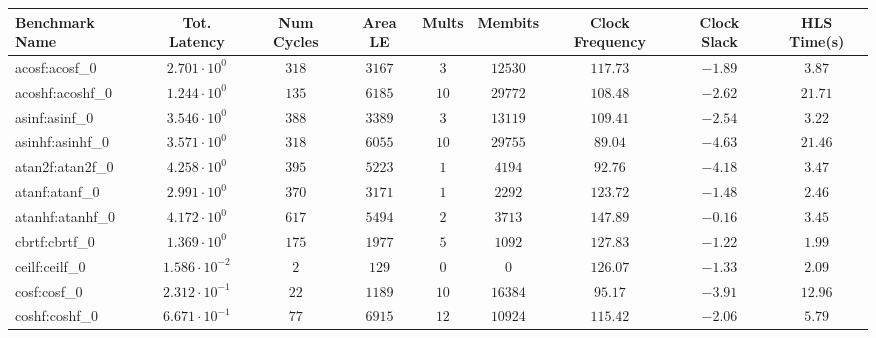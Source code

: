 \begin{tabular}{|l|c|c|c|c|c|c|c|c|}
\hline
Benchmark Name               & Tot. Latency            & Num Cycles & Area LE    & Mults   & Membits    & Clock Frequency & Clock Slack & HLS Time(s) \\
\hline
acosf:acosf\_0               & $ 2.701 \cdot 10^{0}  $ & $ 318    $ & $ 3167   $ & $ 3   $ & $ 12530  $ & $ 117.73      $ & $ -1.89   $ & $ 3.87    $ \\
acoshf:acoshf\_0             & $ 1.244 \cdot 10^{0}  $ & $ 135    $ & $ 6185   $ & $ 10  $ & $ 29772  $ & $ 108.48      $ & $ -2.62   $ & $ 21.71   $ \\
asinf:asinf\_0               & $ 3.546 \cdot 10^{0}  $ & $ 388    $ & $ 3389   $ & $ 3   $ & $ 13119  $ & $ 109.41      $ & $ -2.54   $ & $ 3.22    $ \\
asinhf:asinhf\_0             & $ 3.571 \cdot 10^{0}  $ & $ 318    $ & $ 6055   $ & $ 10  $ & $ 29755  $ & $ 89.04       $ & $ -4.63   $ & $ 21.46   $ \\
atan2f:atan2f\_0             & $ 4.258 \cdot 10^{0}  $ & $ 395    $ & $ 5223   $ & $ 1   $ & $ 4194   $ & $ 92.76       $ & $ -4.18   $ & $ 3.47    $ \\
atanf:atanf\_0               & $ 2.991 \cdot 10^{0}  $ & $ 370    $ & $ 3171   $ & $ 1   $ & $ 2292   $ & $ 123.72      $ & $ -1.48   $ & $ 2.46    $ \\
atanhf:atanhf\_0             & $ 4.172 \cdot 10^{0}  $ & $ 617    $ & $ 5494   $ & $ 2   $ & $ 3713   $ & $ 147.89      $ & $ -0.16   $ & $ 3.45    $ \\
cbrtf:cbrtf\_0               & $ 1.369 \cdot 10^{0}  $ & $ 175    $ & $ 1977   $ & $ 5   $ & $ 1092   $ & $ 127.83      $ & $ -1.22   $ & $ 1.99    $ \\
ceilf:ceilf\_0               & $ 1.586 \cdot 10^{-2} $ & $ 2      $ & $ 129    $ & $ 0   $ & $ 0      $ & $ 126.07      $ & $ -1.33   $ & $ 2.09    $ \\
cosf:cosf\_0                 & $ 2.312 \cdot 10^{-1} $ & $ 22     $ & $ 1189   $ & $ 10  $ & $ 16384  $ & $ 95.17       $ & $ -3.91   $ & $ 12.96   $ \\
coshf:coshf\_0               & $ 6.671 \cdot 10^{-1} $ & $ 77     $ & $ 6915   $ & $ 12  $ & $ 10924  $ & $ 115.42      $ & $ -2.06   $ & $ 5.79    $ \\

\end{tabular}
